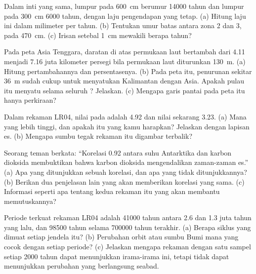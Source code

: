 \begin{exercise}[$\star\star$]\label{exo:g12:past-climates:8}
Dalam inti yang sama, lumpur pada \qty{600}{cm} berumur \num{14000} tahun dan
lumpur pada \qty{300}{cm} \num{6000} tahun, dengan laju pengendapan yang tetap.
(a) Hitung laju ini dalam milimeter per tahun. (b) Tentukan umur batas antara
zona 2 dan 3, pada \qty{470}{cm}. (c) Irisan setebal \qty{1}{cm} mewakili
berapa tahun?
\end{exercise}

\begin{exercise}[$\star\star$]\label{exo:g12:past-climates:9}
Pada peta Asia Tenggara, daratan di atas permukaan laut bertambah dari 4.11
menjadi 7.16 juta kilometer persegi bila permukaan laut diturunkan
\qty{130}{m}. (a) Hitung pertambahannya dan persentasenya. (b) Pada peta itu,
penurunan sekitar \qty{36}{m} sudah cukup untuk menyatukan Kalimantan dengan
Asia. Apakah pulau itu menyatu selama seluruh ?
Jelaskan. (c) Mengapa garis pantai pada peta itu hanya perkiraan?
\end{exercise}

\begin{exercise}[$\star\star$]\label{exo:g12:past-climates:10}
Dalam rekaman LR04, nilai pada  adalah
\qty{4.92}{\permil} dan nilai sekarang \qty{3.23}{\permil}. (a) Mana yang lebih
tinggi, dan apakah itu yang kamu harapkan? Jelaskan dengan lapisan es.
(b) Mengapa sumbu tegak rekaman itu digambar terbalik?
\end{exercise}

\begin{exercise}[$\star\star$]\label{exo:g12:past-climates:11}
Seorang teman berkata: ``Korelasi 0.92 antara suhu Antarktika dan karbon
dioksida membuktikan bahwa karbon dioksida mengendalikan zaman-zaman es.''
(a) Apa yang ditunjukkan sebuah korelasi, dan apa yang tidak ditunjukkannya?
(b) Berikan dua penjelasan lain yang akan memberikan korelasi yang sama.
(c) Informasi seperti apa tentang kedua rekaman itu yang akan membantu
memutuskannya?
\end{exercise}

\begin{exercise}[$\star\star\star$]\label{exo:g12:past-climates:12}
Periode terkuat rekaman LR04 adalah \num{41000} tahun antara 2.6 dan 1.3 juta
tahun yang lalu, dan \num{98500} tahun selama \num{700000} tahun terakhir.
(a) Berapa siklus yang dimuat setiap jendela itu? (b) Perubahan orbit atau
sumbu Bumi mana yang cocok dengan setiap periode? (c) Jelaskan mengapa rekaman
dengan satu sampel setiap \num{2000} tahun dapat menunjukkan irama-irama ini,
tetapi tidak dapat menunjukkan perubahan yang berlangsung seabad.
\end{exercise}

